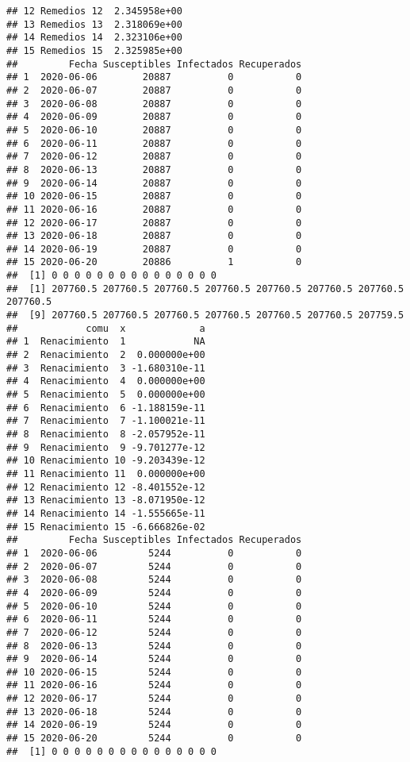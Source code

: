 \documentclass[
]{article}
\begin{document}
\begin{verbatim}
## 12 Remedios 12  2.345958e+00
## 13 Remedios 13  2.318069e+00
## 14 Remedios 14  2.323106e+00
## 15 Remedios 15  2.325985e+00
##         Fecha Susceptibles Infectados Recuperados
## 1  2020-06-06        20887          0           0
## 2  2020-06-07        20887          0           0
## 3  2020-06-08        20887          0           0
## 4  2020-06-09        20887          0           0
## 5  2020-06-10        20887          0           0
## 6  2020-06-11        20887          0           0
## 7  2020-06-12        20887          0           0
## 8  2020-06-13        20887          0           0
## 9  2020-06-14        20887          0           0
## 10 2020-06-15        20887          0           0
## 11 2020-06-16        20887          0           0
## 12 2020-06-17        20887          0           0
## 13 2020-06-18        20887          0           0
## 14 2020-06-19        20887          0           0
## 15 2020-06-20        20886          1           0
##  [1] 0 0 0 0 0 0 0 0 0 0 0 0 0 0 0
##  [1] 207760.5 207760.5 207760.5 207760.5 207760.5 207760.5 207760.5 207760.5
##  [9] 207760.5 207760.5 207760.5 207760.5 207760.5 207760.5 207759.5
##            comu  x             a
## 1  Renacimiento  1            NA
## 2  Renacimiento  2  0.000000e+00
## 3  Renacimiento  3 -1.680310e-11
## 4  Renacimiento  4  0.000000e+00
## 5  Renacimiento  5  0.000000e+00
## 6  Renacimiento  6 -1.188159e-11
## 7  Renacimiento  7 -1.100021e-11
## 8  Renacimiento  8 -2.057952e-11
## 9  Renacimiento  9 -9.701277e-12
## 10 Renacimiento 10 -9.203439e-12
## 11 Renacimiento 11  0.000000e+00
## 12 Renacimiento 12 -8.401552e-12
## 13 Renacimiento 13 -8.071950e-12
## 14 Renacimiento 14 -1.555665e-11
## 15 Renacimiento 15 -6.666826e-02
##         Fecha Susceptibles Infectados Recuperados
## 1  2020-06-06         5244          0           0
## 2  2020-06-07         5244          0           0
## 3  2020-06-08         5244          0           0
## 4  2020-06-09         5244          0           0
## 5  2020-06-10         5244          0           0
## 6  2020-06-11         5244          0           0
## 7  2020-06-12         5244          0           0
## 8  2020-06-13         5244          0           0
## 9  2020-06-14         5244          0           0
## 10 2020-06-15         5244          0           0
## 11 2020-06-16         5244          0           0
## 12 2020-06-17         5244          0           0
## 13 2020-06-18         5244          0           0
## 14 2020-06-19         5244          0           0
## 15 2020-06-20         5244          0           0
##  [1] 0 0 0 0 0 0 0 0 0 0 0 0 0 0 0

\end{verbatim}
\end{document}
